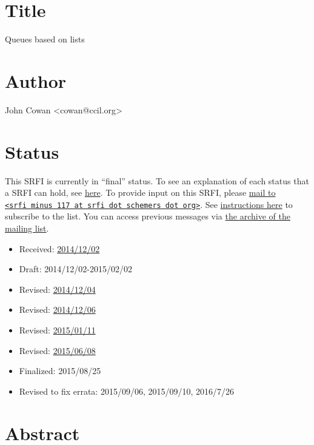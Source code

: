 \section{Title}\label{title}

Queues based on lists

\section{Author}\label{author}

John Cowan \textless{}cowan@ccil.org\textgreater{}

\section{Status}\label{status}

This SRFI is currently in ``final'' status. To see an explanation of
each status that a SRFI can hold, see
\href{http://srfi.schemers.org/srfi-process.html}{here}. To provide
input on this SRFI, please
\href{mailto:srfi\%20minus\%20117\%20at\%20srfi\%20dot\%20schemers\%20dot\%20org}{mail
to
\texttt{\textless{}srfi\ minus\ 117\ at\ srfi\ dot\ schemers\ dot\ org\textgreater{}}}.
See \href{../srfi-list-subscribe.html}{instructions here} to subscribe
to the list. You can access previous messages via
\href{mail-archive/maillist.html}{the archive of the mailing list}.

\begin{itemize}
\tightlist
\item
  Received:
  \href{http://srfi.schemers.org/srfi-117/srfi-117-1.1.html}{2014/12/02}
\item
  Draft: 2014/12/02-2015/02/02
\item
  Revised:
  \href{http://srfi.schemers.org/srfi-117/srfi-117-1.2.html}{2014/12/04}
\item
  Revised:
  \href{http://srfi.schemers.org/srfi-117/srfi-117-1.3.html}{2014/12/06}
\item
  Revised:
  \href{http://srfi.schemers.org/srfi-117/srfi-117-1.4.html}{2015/01/11}
\item
  Revised:
  \href{http://srfi.schemers.org/srfi-117/srfi-117-1.5.html}{2015/06/08}
\item
  Finalized: 2015/08/25
\item
  Revised to fix errata: 2015/09/06, 2015/09/10, 2016/7/26
\end{itemize}

\section{Abstract}\label{abstract}

